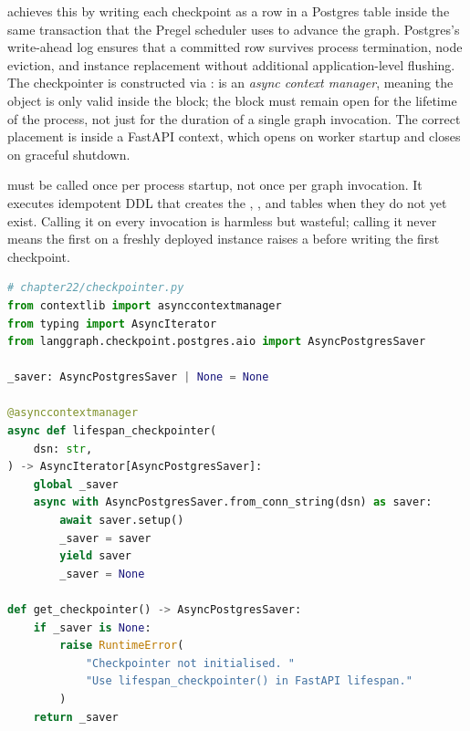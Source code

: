  achieves this by writing each checkpoint as a
row in a Postgres  table inside the same transaction
that the Pregel scheduler uses to advance the graph. Postgres's
write-ahead log ensures that a committed row survives process termination,
node eviction, and instance replacement without additional application-level
flushing. The checkpointer is constructed via
:
 is an \emph{async context manager}, meaning the
 object is only valid inside the  block; the
block must remain open for the lifetime of the process, not just for the
duration of a single graph invocation. The correct placement is inside a
FastAPI  context, which opens on worker startup and closes
on graceful shutdown.

 must be called once per process startup, not once per
graph invocation. It executes idempotent 
DDL that creates the , , and
 tables when they do not yet exist. Calling
it on every invocation is harmless but wasteful; calling it never means
the first  on a freshly deployed instance raises a
 before writing the first checkpoint.

\begin{lstlisting}[language=Python,
  caption={AsyncPostgresSaver as a lifespan-scoped context manager;
           get\_checkpointer factory with startup guard},
  label={lst:durable-checkpointer}]
# chapter22/checkpointer.py
from contextlib import asynccontextmanager
from typing import AsyncIterator
from langgraph.checkpoint.postgres.aio import AsyncPostgresSaver

_saver: AsyncPostgresSaver | None = None

@asynccontextmanager
async def lifespan_checkpointer(
    dsn: str,
) -> AsyncIterator[AsyncPostgresSaver]:
    global _saver
    async with AsyncPostgresSaver.from_conn_string(dsn) as saver:
        await saver.setup()
        _saver = saver
        yield saver
        _saver = None

def get_checkpointer() -> AsyncPostgresSaver:
    if _saver is None:
        raise RuntimeError(
            "Checkpointer not initialised. "
            "Use lifespan_checkpointer() in FastAPI lifespan."
        )
    return _saver
\end{lstlisting}

